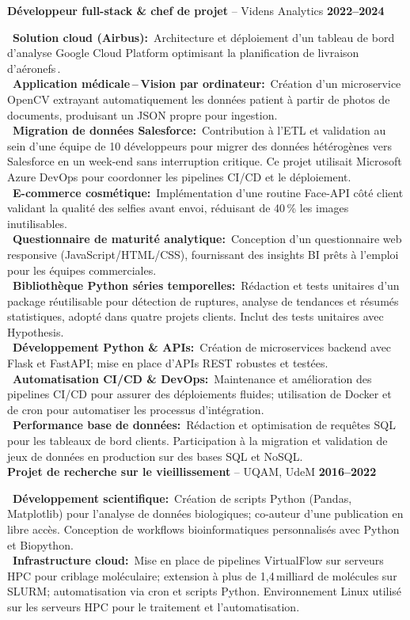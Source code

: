 \documentclass[a4paper,10pt]{article}
\newcommand{\resumeItem}[3]{%
  \noindent\textbf{#1} -- #2 \hfill \textbf{#3} \\
  \vspace{0.3em}
}
\newcommand{\jobItem}[2]{%
  \noindent
  \textbullet\ \textbf{#1\ifthenelse{\boolean{EN}}{}{ }:}~#2\vspace{0.3em} \\
}
\begin{document}
{{    \resumeItem{Développeur full-stack \& chef de projet}{Videns Analytics}{2022–2024}
    \jobItem{Solution cloud (Airbus)}{Architecture et déploiement d'un tableau de bord d'analyse Google Cloud Platform optimisant la planification de livraison d'aéronefs .}
    \jobItem{Application médicale – Vision par ordinateur}{Création d'un microservice OpenCV extrayant automatiquement les données patient à partir de photos de documents, produisant un JSON propre pour ingestion.}
    \jobItem{Migration de données Salesforce}{Contribution à l'ETL et validation au sein d'une équipe de 10 développeurs pour migrer des données hétérogènes vers Salesforce en un week-end sans interruption critique. Ce projet utilisait Microsoft Azure DevOps pour coordonner les pipelines CI/CD et le déploiement.}
    \jobItem{E-commerce cosmétique}{Implémentation d'une routine Face-API côté client validant la qualité des selfies avant envoi, réduisant de 40\,\% les images inutilisables.}
    \jobItem{Questionnaire de maturité analytique}{Conception d'un questionnaire web responsive (JavaScript/HTML/CSS), fournissant des insights BI prêts à l'emploi pour les équipes commerciales.}
    \jobItem{Bibliothèque Python séries temporelles}{Rédaction et tests unitaires d'un package réutilisable pour détection de ruptures, analyse de tendances et résumés statistiques, adopté dans quatre projets clients. Inclut des tests unitaires avec Hypothesis.}
    \jobItem{Développement Python \& APIs}{Création de microservices backend avec Flask et FastAPI; mise en place d’APIs REST robustes et testées.}
    \jobItem{Automatisation CI/CD \& DevOps}{Maintenance et amélioration des pipelines CI/CD pour assurer des déploiements fluides; utilisation de Docker et de cron pour automatiser les processus d’intégration.}
    \jobItem{Performance base de données}{Rédaction et optimisation de requêtes SQL pour les tableaux de bord clients. Participation à la migration et validation de jeux de données en production sur des bases SQL et NoSQL.}
    \vspace{1em}
    \resumeItem{Projet de recherche sur le vieillissement}{UQAM, UdeM}{2016–2022}
    \jobItem{Développement scientifique}{Création de scripts Python (Pandas, Matplotlib) pour l'analyse de données biologiques; co-auteur d’une publication en libre accès. Conception de workflows bioinformatiques personnalisés avec Python et Biopython.}
    \jobItem{Infrastructure cloud}{Mise en place de pipelines VirtualFlow sur serveurs HPC pour criblage moléculaire; extension à plus de 1,4 milliard de molécules sur SLURM; automatisation via cron et scripts Python. Environnement Linux utilisé sur les serveurs HPC pour le traitement et l'automatisation.}
}}
\end{document}
